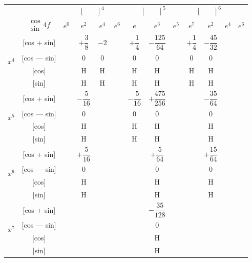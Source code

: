 \documentclass[11pt,a4paper]{book}
\begin{document}
\begin{center}
\small
\begin{tabular}{|c|c|c|c|c|c|c|c|c|c|c|c|}
\hline
& &  &  &  \\
& $\begin{smallmatrix} \cos \\ \sin \end{smallmatrix} 4f$ & $e^0$ & $e^2$ & $e^4$ & $e^6$ & $e$ & $e^3$ & $e^5$ & $e^7$ & $e^2$ & $e^4$ & $e^6$ \\
\hline
{} & [cos + sin] & & $+\dfrac{3}{8}$ & $-2$ & & $+\dfrac{1}{4}$ & $-\dfrac{125}{64}$ & & $+\dfrac{1}{4}$ & $-\dfrac{45}{32}$ \\
& [cos --- sin] & & $0$ & $0$ & & $0$ & $0$ & & $0$ & $0$ \\
& [cos] & & H & H & & H & H & & H & H \\
& [sin] & & H & H & & H & H & & H & H \\
\hline
{} & [cos + sin] & & $-\dfrac{5}{16}$ & & & $-\dfrac{5}{16}$ & $+\dfrac{475}{256}$ & & & $-\dfrac{35}{64}$ \\
& [cos --- sin] & & $0$ & & & $0$ & $0$ & & & $0$ \\
& [cos] & & H & & & H & H & & & H \\
& [sin] & & H & & & H & H & & & H \\
\hline
{} & [cos + sin] & & $+\dfrac{5}{16}$ & & & & $+\dfrac{5}{64}$ & & & $+\dfrac{15}{64}$ \\
& [cos --- sin] & & $0$ & & & & $0$ & & & $0$ \\
& [cos] & & H & & & & H & & & H \\
& [sin] & & H & & & & H & & & H \\
\hline
{} & [cos + sin] & & & & & & $-\dfrac{35}{128}$ & & \\
& [cos --- sin] & & & & & & $0$ & & \\
& [cos] & & & & & & H & & \\
& [sin] & & & & & & H & & \\
\hline
\end{tabular}
\end{center}

\newpage
{}
\end{document}
